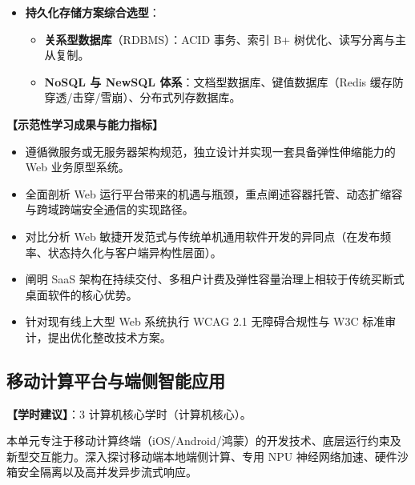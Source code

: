 \begin{itemize}
    \begin{itemize}
        \item \textbf{单体架构 vs. 微服务架构}：服务解耦、领域驱动设计（DDD）、分布式事务（Saga 模式）。
        \item \textbf{微前端架构}：独立构建与部署、模块联邦、运行时沙箱隔离。
        \item \textbf{事件驱动架构}（EDA） \textbf{vs. RESTful API 架构}：异步消息队列高吞吐解耦 vs. 同步轻量契约通信的优劣权衡。
        \item \textbf{无服务器计算}：函数即服务、冷启动优化、事件源触发与按需弹性计费。
    \end{itemize}
    \item \textbf{持久化存储方案综合选型}：
    \begin{itemize}
        \item \textbf{关系型数据库}（RDBMS）：ACID 事务、索引 B+ 树优化、读写分离与主从复制。
        \item \textbf{NoSQL 与 NewSQL 体系}：文档型数据库、键值数据库（Redis 缓存防穿透/击穿/雪崩）、分布式列存数据库。
    \end{itemize}
\end{itemize}

\textbf{【示范性学习成果与能力指标】}
\begin{itemize}
    \item 遵循微服务或无服务器架构规范，独立设计并实现一套具备弹性伸缩能力的 Web 业务原型系统。
    \item 全面剖析 Web 运行平台带来的机遇与瓶颈，重点阐述容器托管、动态扩缩容与跨域跨端安全通信的实现路径。
    \item 对比分析 Web 敏捷开发范式与传统单机通用软件开发的异同点（在发布频率、状态持久化与客户端异构性层面）。
    \item 阐明 SaaS 架构在持续交付、多租户计费及弹性容量治理上相较于传统买断式桌面软件的核心优势。
    \item 针对现有线上大型 Web 系统执行 WCAG 2.1 无障碍合规性与 W3C 标准审计，提出优化整改技术方案。
\end{itemize}

\subsection{移动计算平台与端侧智能应用}
\textbf{【学时建议】}：3 计算机核心学时（计算机核心）。

本单元专注于移动计算终端（iOS/Android/鸿蒙）的开发技术、底层运行约束及新型交互能力。深入探讨移动端本地端侧计算、专用 NPU 神经网络加速、硬件沙箱安全隔离以及高并发异步流式响应。

